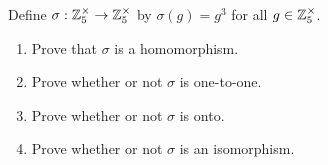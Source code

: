 
Define $\sigma:\mathbb{Z}_5^\times\to \mathbb{Z}_5^\times$ by $\sigma(g)=g^3$ for all $g\in\mathbb{Z}_5^\times$. 
\begin{enumerate}[label=(\alph*)]
	\item Prove that $\sigma$ is a homomorphism.\vfill
	\item Prove whether or not $\sigma$ is one-to-one.\vfill
	\item Prove whether or not $\sigma$ is onto.\vfill
	\item Prove whether or not $\sigma$ is an isomorphism.\vskip 1in
\end{enumerate}